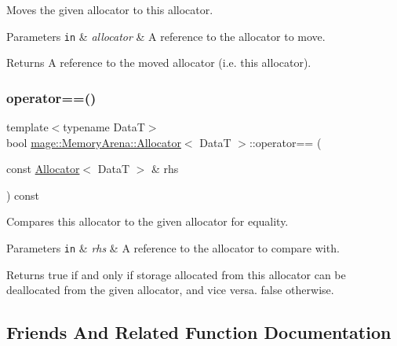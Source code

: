 Moves the given allocator to this allocator.


\begin{DoxyParams}[1]{Parameters}
\mbox{\tt in}  & {\em allocator} & A reference to the allocator to move. \\
\hline
\end{DoxyParams}
\begin{DoxyReturn}{Returns}
A reference to the moved allocator (i.\+e. this allocator). 
\end{DoxyReturn}
\hypertarget{structmage_1_1_memory_arena_1_1_allocator_ad76b72baf40d1bfcd233f5cac1f6b4a7}{}\label{structmage_1_1_memory_arena_1_1_allocator_ad76b72baf40d1bfcd233f5cac1f6b4a7} 
\subsubsection{\texorpdfstring{operator==()}{operator==()}}
{\footnotesize\ttfamily template$<$typename DataT$>$ \\
bool \hyperlink{structmage_1_1_memory_arena_1_1_allocator}{mage\+::\+Memory\+Arena\+::\+Allocator}$<$ DataT $>$\+::operator== (\begin{DoxyParamCaption}\item[{const \hyperlink{structmage_1_1_memory_arena_1_1_allocator}{Allocator}$<$ DataT $>$ \&}]{rhs }\end{DoxyParamCaption}) const\hspace{0.3cm}{\ttfamily [noexcept]}}

Compares this allocator to the given allocator for equality.


\begin{DoxyParams}[1]{Parameters}
\mbox{\tt in}  & {\em rhs} & A reference to the allocator to compare with. \\
\hline
\end{DoxyParams}
\begin{DoxyReturn}{Returns}
{\ttfamily true} if and only if storage allocated from this allocator can be deallocated from the given allocator, and vice versa. {\ttfamily false} otherwise. 
\end{DoxyReturn}


\subsection{Friends And Related Function Documentation}
\hypertarget{structmage_1_1_memory_arena_1_1_allocator_a934e79307a45b6e72da26d1f10079550}{}\label{structmage_1_1_memory_arena_1_1_allocator_a934e79307a45b6e72da26d1f10079550} 
